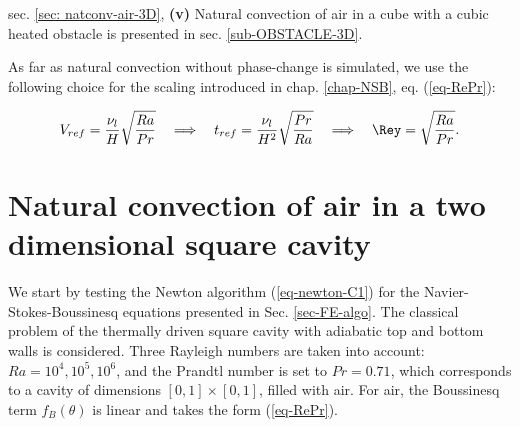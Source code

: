 sec. \ref{sec: natconv-air-3D}, \newline{}
{\bf(v)} Natural convection of air in a cube with a cubic heated obstacle is presented in sec. \ref{sub-OBSTACLE-3D}.

As far as natural convection without phase-change is simulated, we use the following choice for the scaling introduced in chap. \ref{chap-NSB}, eq. (\ref{eq-RePr}):

\begin{equation}
   V_{ref} = \frac{\nu_l}{H} \sqrt{\frac{Ra}{Pr}} 
   \quad \Longrightarrow \quad t_{ref} = \frac{\nu_l}{H^2} \sqrt{\frac{Pr}{Ra}} 
   \quad \Longrightarrow \quad \Rey = \sqrt{\frac{Ra}{Pr}}.
\end{equation} 


\section{Natural convection of air in a two dimensional square cavity}\label{sec: natconv-air-2D}
We start by testing the Newton algorithm (\ref{eq-newton-C1}) for the Navier-Stokes-Boussinesq  equations presented in Sec. \ref{sec-FE-algo}.
The classical problem of the thermally driven square cavity with adiabatic top and bottom walls is considered.
Three Rayleigh numbers are taken into account: $Ra = 10^4, 10^5, 10^6$, and the Prandtl number is set to $Pr = 0.71$, which corresponds to a cavity of dimensions $[ 0 , 1] \times [ 0 , 1]$, filled with air.
For air, the Boussinesq term $f_B(\theta)$ is linear and takes the form (\ref{eq-RePr}).

